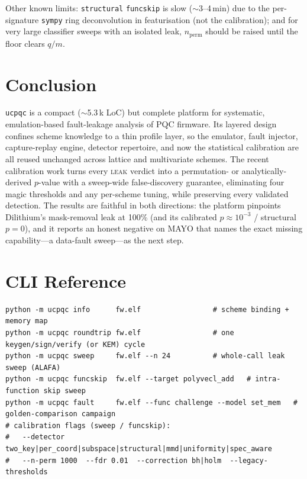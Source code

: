 \documentclass[11pt]{article}
\newcommand{\code}[1]{\texttt{#1}}
\newcommand{\ucpqc}{\code{ucpqc}}
\begin{document}
Other known limits: \code{structural} \code{funcskip} is slow ($\sim$3--4\,min) due
to the per-signature \code{sympy} ring deconvolution in featurisation (not the
calibration); and for very large classifier sweeps with an isolated leak,
$n_{\text{perm}}$ should be raised until the floor clears $q/m$.

\section{Conclusion}

\ucpqc{} is a compact ($\sim$5.3\,k LoC) but complete platform for systematic,
emulation-based fault-leakage analysis of PQC firmware. Its layered design confines
scheme knowledge to a thin profile layer, so the emulator, fault injector,
capture-replay engine, detector repertoire, and now the statistical calibration are
all reused unchanged across lattice and multivariate schemes. The recent calibration
work turns every \textsc{leak} verdict into a permutation- or analytically-derived
$p$-value with a sweep-wide false-discovery guarantee, eliminating four magic
thresholds and any per-scheme tuning, while preserving every validated detection.
The results are faithful in both directions: the platform pinpoints Dilithium's
mask-removal leak at 100\% (and its calibrated $p\approx10^{-3}$ / structural $p=0$),
and it reports an honest negative on MAYO that names the exact missing capability---a
data-fault sweep---as the next step.

\appendix
\section{CLI Reference}
\begin{lstlisting}[style=sh]
python -m ucpqc info      fw.elf                 # scheme binding + memory map
python -m ucpqc roundtrip fw.elf                 # one keygen/sign/verify (or KEM) cycle
python -m ucpqc sweep     fw.elf --n 24          # whole-call leak sweep (ALAFA)
python -m ucpqc funcskip  fw.elf --target polyvecl_add   # intra-function skip sweep
python -m ucpqc fault     fw.elf --func challenge --model set_mem   # golden-comparison campaign
# calibration flags (sweep / funcskip):
#   --detector two_key|per_coord|subspace|structural|mmd|uniformity|spec_aware
#   --n-perm 1000  --fdr 0.01  --correction bh|holm  --legacy-thresholds
\end{lstlisting}
\end{document}
